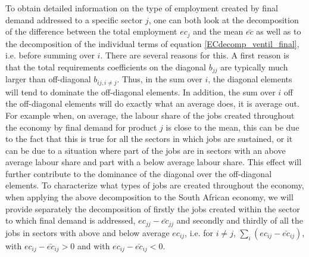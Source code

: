 \documentclass[12pt,english]{article}
\begin{document}
To obtain detailed information on the type of employment created by final demand addressed to a specific sector $j$, one can both look at the decomposition of the difference between the total employment $ec_j$ and the mean $\bar{ec}$ as well as to the decomposition of the individual terms of equation \ref{ECdecomp_ventil_final}, i.e. before summing over $i$. There are several reasons for this. A first reason is that the total requirements coefficients on the diagonal $b_{jj}$ are typically much larger than off-diagonal $b_{ij, i\neq j}$. Thus, in the sum over $i$, the diagonal elements will tend to dominate the off-diagonal elements. In addition, the sum over $i$ off the off-diagonal elements will do exactly what an average does, it is average out. For example when, on average, the labour share of the jobs created throughout the economy by final demand for product $j$ is close to the mean, this can be due to the fact that this is true for all the sectors in which jobs are sustained, or it can be due to a situation where part of the jobs are in sectors with an above average labour share and part with a below average labour share. This effect will further contribute to the dominance of the diagonal over the off-diagonal elements.
To characterize what types of jobs are created throughout the economy, when applying the above decomposition to the South African economy, we will provide separately the decomposition of firstly the jobs created within the sector to which final demand is addressed, $ec_{jj} - \bar{ec}_{jj}$ and secondly and thirdly of all the jobs in sectors with above and below average $ec_{ij}$, i.e. for $i\neq j$, $\sum_i (ec_{ij} - \bar{ec}_{ij})$, with $ec_{ij} - \bar{ec}_{ij} >0$ and with $ec_{ij} - \bar{ec}_{ij} <0$.
\end{document}
